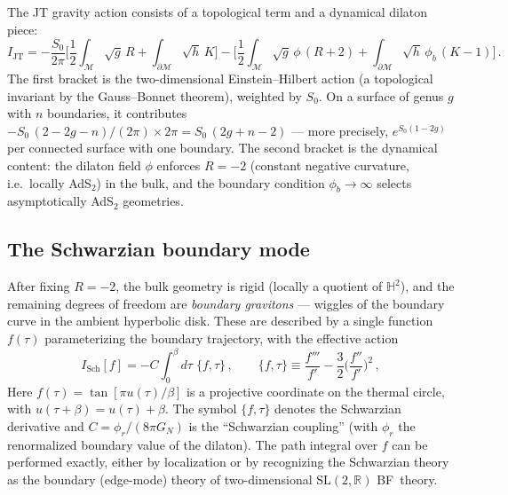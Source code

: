 \documentclass[11pt,letterpaper]{article}
\theoremstyle{plain}
\theoremstyle{definition}
\theoremstyle{remark}
\begin{document}
The JT gravity action consists of a topological term and a dynamical dilaton
piece:
\begin{equation}
  I_{\mathrm{JT}} = -\frac{S_0}{2\pi}
  \biggl[\frac{1}{2}\int_{\mathcal{M}} \sqrt{g}\, R
  + \int_{\partial\mathcal{M}} \sqrt{h}\, K\biggr]
  - \biggl[\frac{1}{2}\int_{\mathcal{M}} \sqrt{g}\, \phi\,(R + 2)
  + \int_{\partial\mathcal{M}} \sqrt{h}\, \phi_b\,(K-1)\biggr]\,.
  \label{eq16:jt_action}
\end{equation}
The first bracket is the two-dimensional Einstein--Hilbert action (a topological
invariant by the Gauss--Bonnet theorem), weighted by $S_0$.  On a surface of
genus $g$ with $n$ boundaries, it contributes
$-S_0\,(2 - 2g - n)/(2\pi) \times 2\pi = S_0\,(2g + n - 2)$
--- more precisely, $e^{S_0(1-2g)}$ per connected surface with one boundary.
The second bracket is the dynamical content: the dilaton field $\phi$ enforces
$R = -2$ (constant negative curvature, i.e.\ locally AdS$_2$) in the bulk, and
the boundary condition $\phi_b \to \infty$ selects asymptotically AdS$_2$
geometries.

\subsection{The Schwarzian boundary mode}

After fixing $R = -2$, the bulk geometry is rigid (locally a quotient of
$\mathbb{H}^2$), and the remaining degrees of freedom are
\emph{boundary gravitons} --- wiggles of the boundary curve in the ambient
hyperbolic disk.  These are described by a single function $f(\tau)$
parameterizing the boundary trajectory, with the effective action
\cite{maldacena2016,stanfordwitten2017}
\begin{equation}
  I_{\mathrm{Sch}}[f]
  = -C \int_0^{\beta} d\tau\;\{f,\tau\}\,,
  \qquad
  \{f,\tau\} \equiv \frac{f'''}{f'} - \frac{3}{2}
  \biggl(\frac{f''}{f'}\biggr)^{\!2}\,,
  \label{eq16:schwarzian_action}
\end{equation}
Here $f(\tau)=\tan[\pi u(\tau)/\beta]$ is a projective coordinate on the
thermal circle, with $u(\tau+\beta)=u(\tau)+\beta$.
The symbol $\{f,\tau\}$ denotes the Schwarzian derivative and
$C = \phi_r/(8\pi G_N)$ is
the ``Schwarzian coupling'' (with $\phi_r$ the renormalized boundary value of
the dilaton).  The path integral over $f$ can be performed exactly, either by
localization \cite{stanfordwitten2017} or by recognizing the Schwarzian theory
as the boundary (edge-mode) theory of two-dimensional
$\mathrm{SL}(2,\mathbb{R})$ BF~theory.
\end{document}

